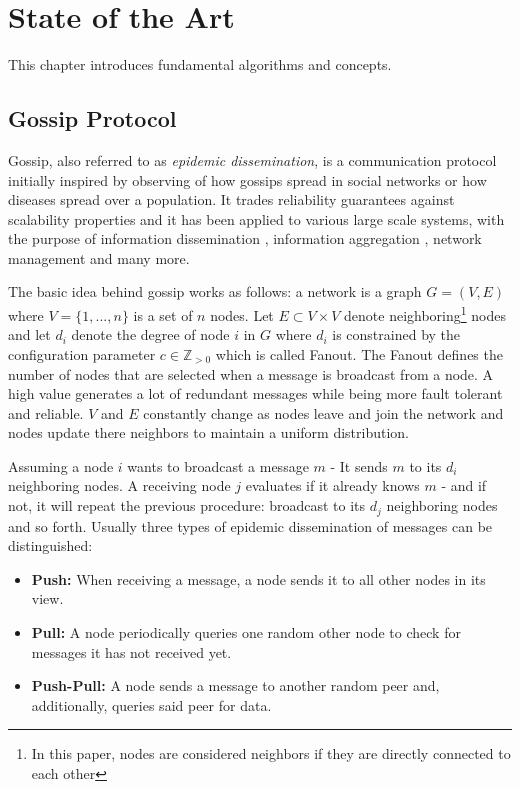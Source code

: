 \documentclass[11pt, english, screen]{report-rd-info}
\begin{document}
\chapter{State of the Art}
\label{chap:StateOfTheArt}

This chapter introduces fundamental algorithms and concepts. 

\section{Gossip Protocol}

Gossip, also referred to as \emph{epidemic dissemination}, is a  communication protocol initially inspired by observing of how gossips spread in social networks or how diseases spread over a population.
It trades reliability guarantees against scalability properties \cite{Eugster:2003:LPB:945506.945507} and it has been applied to various large scale systems, with the purpose of information dissemination \cite{Demers:1987:EAR:41840.41841}, information aggregation \cite{Jelasity:2005:GAL:1082469.1082470}, network management \cite{conf/dsom/VoulgarisS03} and many more.

The basic idea behind gossip works as follows:
a network is a graph $G=(V,E)$ where $V=\{1,...,n\}$ is a set of $n$ nodes.
Let $E \subset V \times V$ denote neighboring\footnote{In this paper, nodes are considered neighbors if they are directly connected to each other} nodes and let $d_i$ denote the degree of node $i$ in $G$ where 
$d_i$ is constrained by the configuration parameter $c \in \mathbb{Z}_{>0}$ which is called Fanout.
The Fanout defines the number of nodes that are selected when a message is broadcast from a node.
A high value generates a lot of redundant messages while being more fault tolerant and reliable. 
$V$ and $E$ constantly change as nodes leave and join the network and nodes update there neighbors to maintain a uniform distribution.

Assuming a node $i$ wants to broadcast a message $m$ - It sends $m$ to its $d_i$ neighboring nodes. 
A receiving node $j$ evaluates if it already knows $m$ \cite{Koldehofe03buffermanagement} - and if not, it will repeat the previous procedure: broadcast to its $d_j$ neighboring nodes and so forth. 
Usually three types of epidemic dissemination of messages can be distinguished:
\begin{itemize}
    \item \textbf{Push:} When receiving a message, a node sends it to all other nodes in its view.
    \item \textbf{Pull:} A node periodically queries one random other node to check for messages it has not received yet.
    \item \textbf{Push-Pull:} A node sends a message to another random peer and, additionally, queries said peer for data.
\end{itemize}
\end{document}
